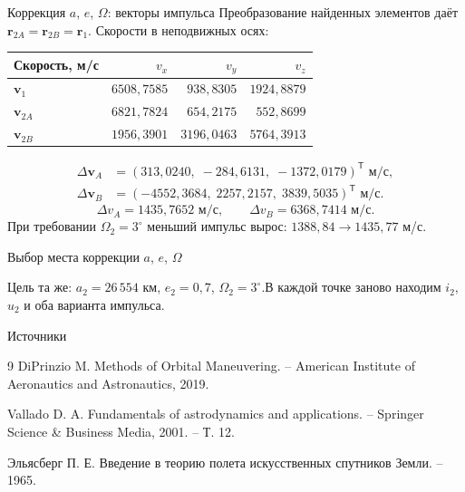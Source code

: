 \documentclass[11pt,aspectratio=169,t]{beamer}
\begin{document}
\begin{frame}{Коррекция $a$, $e$, $\Omega$: векторы импульса}
Преобразование найденных элементов даёт $\mathbf r_{2A}=\mathbf r_{2B}=\mathbf r_1$.
Скорости в неподвижных осях:
\par\smallskip\centering
\renewcommand{\arraystretch}{1.05}
\begin{tabular}{@{}lrrr@{}}
\toprule
Скорость, м/с & $v_x$ & $v_y$ & $v_z$\\\midrule
$\mathbf v_1$ & $6508{,}7585$ & $938{,}8305$ & $1924{,}8879$\\
$\mathbf v_{2A}$ & $6821{,}7824$ & $654{,}2175$ & $552{,}8699$\\
$\mathbf v_{2B}$ & $1956{,}3901$ & $3196{,}0463$ & $5764{,}3913$\\\bottomrule
\end{tabular}\par
\begin{align*}
\Delta\mathbf v_A&=(313{,}0240,\;-284{,}6131,\;-1372{,}0179)^{\mathsf T}\text{ м/с},\\
\Delta\mathbf v_B&=(-4552{,}3684,\;2257{,}2157,\;3839{,}5035)^{\mathsf T}\text{ м/с}.
\end{align*}
\[
\boxed{\Delta v_A=1435{,}7652\text{ м/с}},\qquad
\boxed{\Delta v_B=6368{,}7414\text{ м/с}}.
\]
\justifying
При требовании $\Omega_2=3^\circ$ меньший импульс вырос: $1388{,}84\to1435{,}77$ м/с.
\end{frame}

\begin{frame}{Выбор места коррекции $a$, $e$, $\Omega$}
\centering\par
\smallskip\raggedright
Цель та же: $a_2=26\,554$ км, $e_2=0{,}7$, $\Omega_2=3^\circ$.\newline В каждой точке заново находим $i_2$, $u_2$ и оба варианта импульса.
\end{frame}

\begin{frame}{Источники}
\begin{thebibliography}{9}
DiPrinzio M. Methods of Orbital Maneuvering. – American Institute of Aeronautics and Astronautics, 2019.

Vallado D. A. Fundamentals of astrodynamics and applications. – Springer Science \& Business Media, 2001. – Т. 12.

Эльясберг П. Е. Введение в теорию полета искусственных спутников Земли. – 1965.
\end{thebibliography}
\end{frame}
\end{document}
